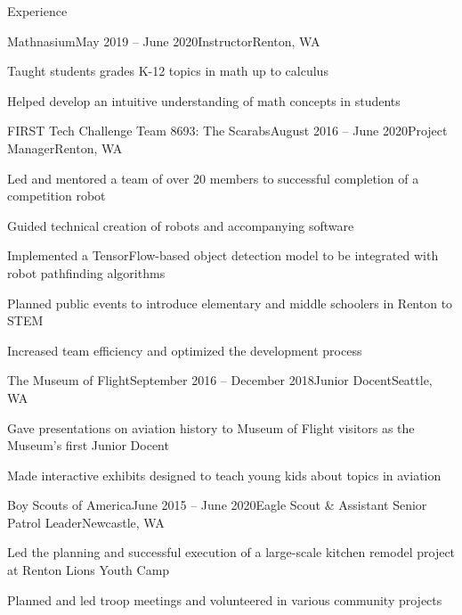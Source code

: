 \documentclass{resume} %
\begin{document}

\vspace{-1em} %
\begin{rSection}{Experience}

\begin{rSubsection}{Mathnasium}{May 2019 – June 2020}{Instructor}{Renton, WA}
\item Taught students grades K-12 topics in math up to calculus
\item Helped develop an intuitive understanding of math concepts in students
\end{rSubsection}

\begin{rSubsection}{FIRST Tech Challenge Team 8693: The Scarabs}{August 2016 – June 2020}{Project Manager}{Renton, WA}
\item Led and mentored a team of over 20 members to successful completion of a competition robot
\item Guided technical creation of robots and accompanying software
\item Implemented a TensorFlow-based object detection model to be integrated with robot pathfinding algorithms
\item Planned public events to introduce elementary and middle schoolers in Renton to STEM
\item Increased team efficiency and optimized the development process
\end{rSubsection}

\begin{rSubsection}{The Museum of Flight}{September 2016 – December 2018}{Junior Docent}{Seattle, WA}
\item Gave presentations on aviation history to Museum of Flight visitors as the Museum's first Junior Docent
\item Made interactive exhibits designed to teach young kids about topics in aviation
\end{rSubsection}

\begin{rSubsection}{Boy Scouts of America}{June 2015 – June 2020}{Eagle Scout \& Assistant Senior Patrol Leader}{Newcastle, WA}
\item Led the planning and successful execution of a large-scale kitchen remodel project at Renton Lions Youth Camp
\item Planned and led troop meetings and volunteered in various community projects
\end{rSubsection}

\end{rSection}
\end{document}
